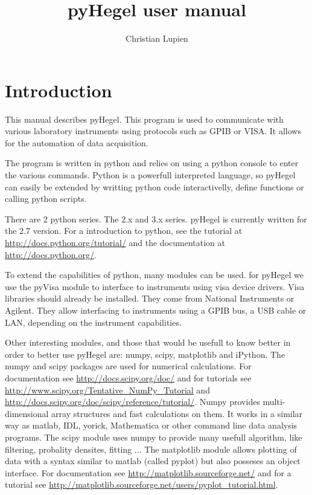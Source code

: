 \documentclass[letterpaper,12pt]{article}
\title{pyHegel user manual}
\author{Christian Lupien}
\begin{document}
\maketitle

\section{Introduction}
This manual describes pyHegel. This program is used to communicate with
various laboratory instruments using protocols such as GPIB or VISA. It 
allows for the automation of data acquisition.

The program is written in python and relies on using a python console to enter
the various commands. Python is a powerfull interpreted language, so pyHegel
can easily be extended by writting python code interactivelly, define functions
or calling python scripts.

There are 2 python series. The 2.x and 3.x series. pyHegel is currently written
for the 2.7 version. For a introduction to python, see the tutorial at 
\url{http://docs.python.org/tutorial/}
and the documentation at
\url{http://docs.python.org/}.

To extend the capabilities of python, many modules can be used. for pyHegel
we use the pyVisa module to interface to instruments using visa device drivers.
Visa libraries should already be installed. They come from National Instruments
or Agilent. They allow interfacing to instruments using a GPIB bus, a USB cable
or LAN, depending on the instrument capabilities.

Other interesting modules, and those that would be usefull to know better in 
order to better use pyHegel are: numpy, scipy, matplotlib and iPython. 
The numpy and scipy packages are used for numerical calculations. For
documentation see \url{http://docs.scipy.org/doc/} and for tutorials see
\url{http://www.scipy.org/Tentative_NumPy_Tutorial} and
\url{http://docs.scipy.org/doc/scipy/reference/tutorial/}. 
Numpy provides multi-dimensional array structures and fast calculations on them.
It works in a similar way as matlab, IDL, yorick, Mathematica or other
command line data analysis programs. The scipy module uses numpy to provide
many usefull algorithm, like filtering, probality densites, fitting ...
The matplotlib module allows plotting of data with a syntax similar to 
matlab (called pyplot) but also posseses an object interface.
For documentation see \url{http://matplotlib.sourceforge.net/}
and for a tutorial see \url{http://matplotlib.sourceforge.net/users/pyplot_tutorial.html}.
\end{document}
